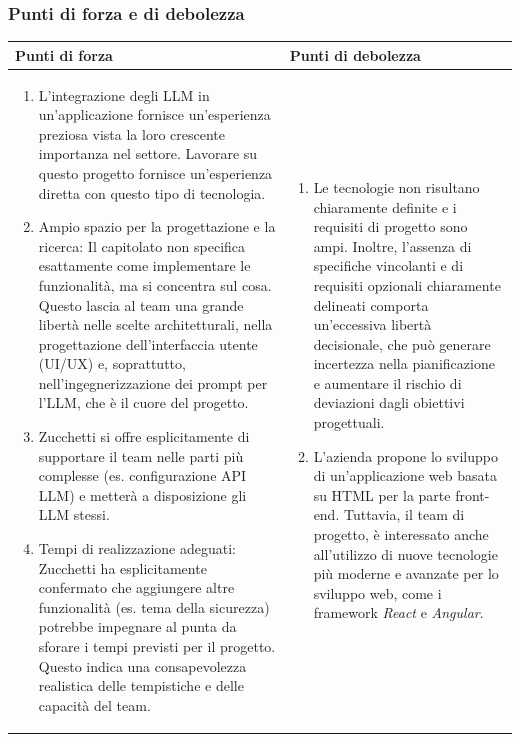 \documentclass[a4paper,11pt]{article}
\begin{document}
\subsubsection{Punti di forza e di debolezza}
\newpage
{\footnotesize
\begin{tabularx}{\textwidth}{|X|X|}
\hline
\rowcolor{lightgray!40} %
\textbf{Punti di forza} & \textbf{Punti di debolezza} \\
\hline
\begin{enumerate}
\item  L'integrazione degli LLM in un'applicazione fornisce un'esperienza preziosa vista la loro crescente importanza nel settore. Lavorare su questo progetto fornisce un'esperienza diretta con questo tipo di tecnologia.
\item  Ampio spazio per la progettazione e la ricerca: Il capitolato non specifica esattamente come implementare le funzionalità, ma si concentra sul cosa. Questo lascia al team una grande libertà nelle scelte architetturali, nella progettazione dell'interfaccia utente (UI/UX) e, soprattutto, nell'ingegnerizzazione dei prompt per l'LLM, che è il cuore del progetto.
\item Zucchetti si offre esplicitamente di supportare il team nelle parti più complesse (es. configurazione API LLM) e metterà a disposizione gli LLM stessi. 
\item Tempi di realizzazione adeguati: Zucchetti ha esplicitamente confermato che aggiungere altre funzionalità (es. tema della sicurezza) potrebbe impegnare al punta da sforare i tempi previsti per il progetto. Questo indica una consapevolezza realistica delle tempistiche e delle capacità del team.
\end{enumerate}
 & \begin{enumerate}
\item Le tecnologie non risultano chiaramente definite e i requisiti di progetto sono ampi. Inoltre, l'assenza di specifiche vincolanti e di requisiti opzionali chiaramente delineati comporta un'eccessiva libertà decisionale, che può generare incertezza nella pianificazione e aumentare il rischio di deviazioni dagli obiettivi progettuali.
\item  L'azienda propone lo sviluppo di un'applicazione web basata su HTML per la parte front-end. Tuttavia, il team di progetto, è interessato anche all'utilizzo di nuove tecnologie più moderne e avanzate per lo sviluppo web, come i framework \textit{React} e \textit{Angular}. 
\end{enumerate} \\
\hline
\end{tabularx}
}
\end{document}
